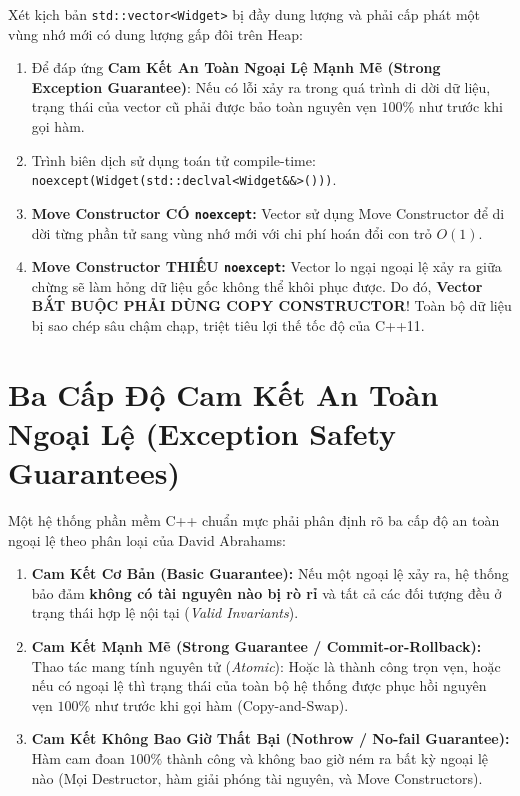 \documentclass[12pt,a4paper,oneside]{book}
\begin{document}
\begin{underhoodbox}
Xét kịch bản \texttt{std::vector<Widget>} bị đầy dung lượng và phải cấp phát một vùng nhớ mới có dung lượng gấp đôi trên Heap:
\begin{enumerate}
    \item Để đáp ứng \textbf{Cam Kết An Toàn Ngoại Lệ Mạnh Mẽ (Strong Exception Guarantee)}: Nếu có lỗi xảy ra trong quá trình di dời dữ liệu, trạng thái của vector cũ phải được bảo toàn nguyên vẹn $100\%$ như trước khi gọi hàm.
    \item Trình biên dịch sử dụng toán tử compile-time: \texttt{noexcept(Widget(std::declval<Widget\&\&>()))}.
    \item \textbf{Move Constructor CÓ \texttt{noexcept}:} Vector sử dụng Move Constructor để di dời từng phần tử sang vùng nhớ mới với chi phí hoán đổi con trỏ $O(1)$.
    \item \textbf{Move Constructor THIẾU \texttt{noexcept}:} Vector lo ngại ngoại lệ xảy ra giữa chừng sẽ làm hỏng dữ liệu gốc không thể khôi phục được. Do đó, \textbf{Vector BẮT BUỘC PHẢI DÙNG COPY CONSTRUCTOR}! Toàn bộ dữ liệu bị sao chép sâu chậm chạp, triệt tiêu lợi thế tốc độ của C++11.
\end{enumerate}
\end{underhoodbox}

\section{Ba Cấp Độ Cam Kết An Toàn Ngoại Lệ (Exception Safety Guarantees)}

Một hệ thống phần mềm C++ chuẩn mực phải phân định rõ ba cấp độ an toàn ngoại lệ theo phân loại của David Abrahams:

\begin{enumerate}
    \item \textbf{Cam Kết Cơ Bản (Basic Guarantee):} Nếu một ngoại lệ xảy ra, hệ thống bảo đảm \textbf{không có tài nguyên nào bị rò rỉ} và tất cả các đối tượng đều ở trạng thái hợp lệ nội tại (\textit{Valid Invariants}).
    \item \textbf{Cam Kết Mạnh Mẽ (Strong Guarantee / Commit-or-Rollback):} Thao tác mang tính nguyên tử (\textit{Atomic}): Hoặc là thành công trọn vẹn, hoặc nếu có ngoại lệ thì trạng thái của toàn bộ hệ thống được phục hồi nguyên vẹn $100\%$ như trước khi gọi hàm (Copy-and-Swap).
    \item \textbf{Cam Kết Không Bao Giờ Thất Bại (Nothrow / No-fail Guarantee):} Hàm cam đoan $100\%$ thành công và không bao giờ ném ra bất kỳ ngoại lệ nào (Mọi Destructor, hàm giải phóng tài nguyên, và Move Constructors).
\end{enumerate}
\end{document}
